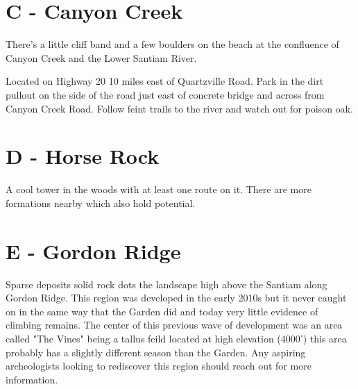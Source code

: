 \begin{multicols}{2}
\needspace{6em}

\section{C - Canyon Creek}\label{sa:Canyon Creek}
There's a little cliff band and a few boulders on the beach at the confluence of Canyon Creek and the Lower Santiam River.

Located on Highway 20 10 miles east of Quartzville Road. Park in the dirt pullout on the side of the road just east of concrete bridge and across from Canyon Creek Road. Follow feint trails to the river and watch out for poison oak.\\




\needspace{6em}

\section{D - Horse Rock}\label{sa:Horse Rock}
A cool tower in the woods with at least one route on it. There are more formations nearby which also hold potential.\\




\needspace{6em}

\section{E - Gordon Ridge}\label{sa:Gordon Ridge}
Sparse deposits solid rock dots the landscape high above the Santiam along Gordon Ridge. This region was developed in the early 2010s but it never caught on in the same way that the Garden did and today very little evidence of climbing remains. The center of this previous wave of development was an area called "The Vines" being a tallus feild located at high elevation (4000') this area probably has a slightly different season than the Garden. Any aspiring archeologists looking to rediscover this region should reach out for more information.\\





\end{multicols}
